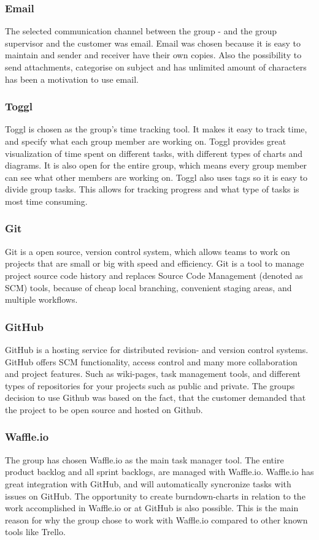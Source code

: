 \subsubsection{Email}
The selected communication channel between the group - and the group supervisor and the customer was email.
Email was chosen because it is easy to maintain and sender and receiver have their own copies. Also the possibility to send attachments, categorise on subject and has unlimited amount of characters has been a motivation to use email.  

\subsubsection{Toggl}
Toggl \cite{Toggl} is chosen as the group's time tracking tool. It makes it easy to track time, and specify what each group member are working on. Toggl provides great visualization of time spent on different tasks, with different types of charts and diagrams. It is also open for the entire group, which means every group member can see what other members are working on. Toggl also uses tags so it is easy to divide group tasks. This allows for tracking progress and what type of tasks is most time consuming.

\subsubsection{Git}
Git \cite{Git} is a open source, version control system, which allows teams to work on projects that are small or big with speed and efficiency. Git is a tool to manage project source code history and replaces Source Code Management (denoted as SCM)  tools, because of cheap local branching, convenient staging areas, and multiple workflows.

\subsubsection{GitHub}
\label{GitHub}
GitHub\cite{GitHub} is a hosting service for distributed revision- and version control systems. GitHub offers SCM functionality, access control and many more collaboration and project features. Such as wiki-pages, task management tools, and different types of repositories for your projects such as public and private. The groups decision to use Github was based on the fact, that the customer demanded that the project to be open source and hosted on Github. 

\subsubsection{Waffle.io}
\label{Waffle.io}
The group has chosen Waffle.io \cite{Waffle} as the main task manager tool. The entire product backlog and all sprint backlogs, are managed with Waffle.io. Waffle.io has great integration with GitHub, and will automatically syncronize tasks with issues on GitHub. The opportunity to create burndown-charts in relation to the work accomplished in Waffle.io or at GitHub is also possible. This is the main reason for why the group chose to work with Waffle.io compared to other known tools like Trello.

